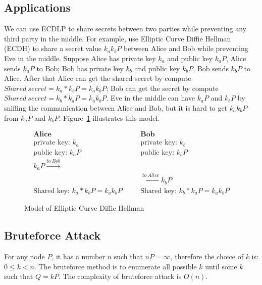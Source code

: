 \documentclass[10pt,a4paper]{article}
\begin{document}
\subsection{Applications}
\indent We can use ECDLP to share secrets between two parties while preventing any third party in the middle. For example, use Elliptic Curve Diffie Hellman (ECDH) to share a secret value $k_ak_bP$ between Alice and Bob while preventing Eve in the middle. Suppose Alice has private key $k_a$ and public key $k_aP$, Alice sends $k_aP$ to Bob; Bob has private key $k_b$ and public key $k_bP$, Bob sends $k_bP$ to Alice. After that Alice can get the shared secret by compute $Shared\ secret = k_a * k_bP = k_ak_bP$; Bob can get the secret by compute $Shared\ secret = k_b * k_aP = k_ak_bP$. Eve in the middle can have $k_aP$ and $k_bP$ by sniffing the communication between Alice and Bob, but it is hard to get $k_ak_bP$ from $k_aP$ and $k_bP$. Figure~\ref{table:ecdh} illustrates this model.  
\begin{figure}
  \centering
  \begin{align*}
& \textbf{Alice} & \quad & \textbf{Bob} & \\
& \text{private key: } k_a & \quad & \text{private key: } k_b & \\
& \text{public key: } k_aP & \quad & \text{public key: } k_bP & \\
& k_aP \xrightarrow{to\ Bob} & \quad &\\
& & \quad & \xleftarrow{to\ Alice} k_bP & \\
& \text{Shared key: } k_a*k_bP=k_ak_bP & \quad  &\text{Shared key: } k_b*k_aP=k_ak_bP &
\end{align*}
  \caption{Model of Elliptic Curve Diffie Hellman}
  \label{table:ecdh}	
\end{figure}
\subsection{Bruteforce Attack}
\indent For any node $P$, it has a number $n$ such that $nP = \infty$, therefore the choice of $k$ is: $0 \leqslant k < n$. The bruteforce method is to enumerate all possible $k$ until some $k$ such that $Q = kP$. The complexity of bruteforce attack is $O(n)$.
\end{document}

